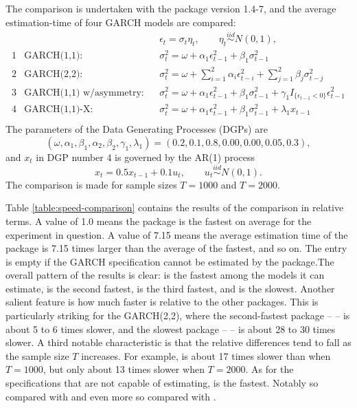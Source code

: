 The comparison is undertaken with the  \citep{Mersmann2019} package version 1.4-7, and the average estimation-time of four GARCH models are compared:
%
\begin{equation*}
	\begin{array}{llcl}
	& & & \epsilon_t = \sigma_t\eta_t, \qquad \eta_t \overset{iid}{\sim} N(0,1), \\[3mm]
	1 & \text{GARCH(1,1):} & & \sigma_t^2 = \omega + \alpha_1\epsilon_{t-1}^2 + \beta_1\sigma_{t-1}^2 \\[3mm]
	2 & \text{GARCH(2,2):} & & \sigma_t^2 = \omega + \sum_{i=1}^2 \alpha_i\epsilon_{t-i}^2 + \sum_{j=1}^2 \beta_j\sigma_{t-j}^2 \\[3mm]
	3 & \text{GARCH(1,1) w/asymmetry:} & & \sigma_t^2 = \omega + \alpha_1\epsilon_{t-1}^2 + \beta_1\sigma_{t-1}^2 + \gamma_1I_{ \{\epsilon_{t-1} < 0\} }\epsilon_{t-1}^2 \\[3mm]
	4 & \text{GARCH(1,1)-X:} & & \sigma_t^2 = \omega + \alpha_1\epsilon_{t-1}^2 + \beta_1\sigma_{t-1}^2 + \lambda_1 x_{t-1} \\[3mm]
	\end{array}
\end{equation*}
%
The parameters of the Data Generating Processes (DGPs) are \[ (\omega, \alpha_1, \beta_1, \alpha_2, \beta_2, \gamma_1, \lambda_1) = (0.2, 0.1, 0.8, 0.00, 0.00, 0.05, 0.3), \] and $x_t$ in DGP number 4 is governed by the AR(1) process
%
\begin{equation*}
	x_t = 0.5x_{t-1} + 0.1u_t, \qquad u_t\overset{iid}{\sim} N(0,1).
\end{equation*}
%
The comparison is made for sample sizes $T=1000$ and $T=2000$.

Table \ref{table:speed-comparison} contains the results of the comparison in relative terms. A value of 1.0 means the package is the fastest on average for the experiment in question. A value of 7.15 means the average estimation time of the package is 7.15 times larger than the average of the fastest, and so on. The entry is empty if the GARCH specification cannot be estimated by the package.The overall pattern of the results is clear:  is the fastest among the models it can estimate,  is the second fastest,  is the third fastest, and  is the slowest. Another salient feature is how much faster  is relative to the other packages. This is particularly striking for the GARCH(2,2), where the second-fastest package --  -- is about 5 to 6 times slower, and the slowest package --  -- is about 28 to 30 times slower. A third notable characteristic is that the relative differences tend to fall as the sample size $T$ increases. For example,  is about 17 times slower than  when $T=1000$, but only about 13 times slower when $T=2000$. As for the specifications that  are not capable of estimating,  is the fastest. Notably so compared with  and even more so compared with .


